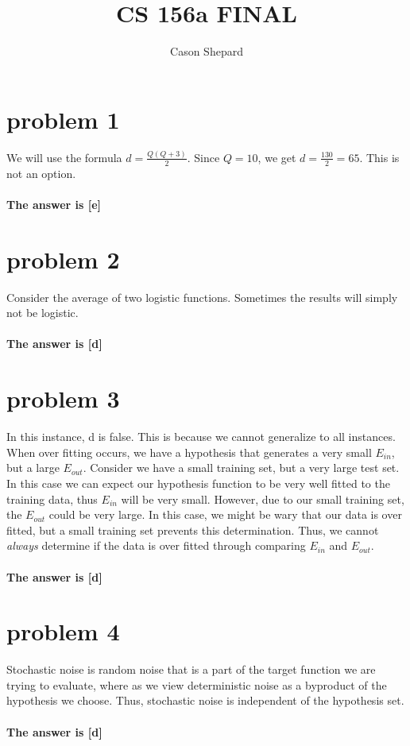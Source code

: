 \documentclass{article}
\title{CS 156a FINAL}
\author{Cason Shepard}
\begin{document}
\maketitle

\section*{problem 1}
We will use the formula $d = \frac{Q(Q+3)}{2}$. Since $Q = 10$, we get $d = \frac{130}{2} = 65$. This is not an option.\\\\
\textbf{The answer is [e]}

\section*{problem 2}
Consider the average of two logistic functions. Sometimes the results will simply not be logistic.\\\\
\textbf{The answer is [d]}

\section*{problem 3}
In this instance, d is false. This is because we cannot generalize to all instances. When over fitting occurs, we have a hypothesis that generates a very small $E_{in}$, but a large $E_{out}$. Consider we have a small training set, but a very large test set. In this case we can expect our hypothesis function to be very well fitted to the training data, thus $E_{in}$ will be very small. However, due to our small training set, the $E_{out}$ could be very large. In this case, we might be wary that our data is over fitted, but a small training set prevents this determination. Thus, we cannot \textit{always} determine if the data is over fitted through comparing $E_{in}$ and $E_{out}$.\\\\
\textbf{The answer is [d]}

\section*{problem 4}
Stochastic noise is random noise that is a part of the target function we are trying to evaluate, where as we view deterministic noise as a byproduct of the hypothesis we choose. Thus, stochastic noise is independent of the hypothesis set.\\\\
\textbf{The answer is [d]}
\end{document}
